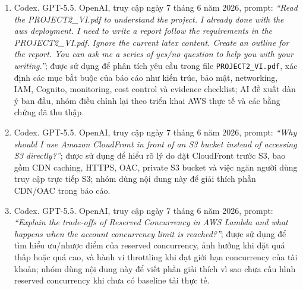 \begin{enumerate}
    \item Codex. GPT-5.5. OpenAI, truy cập ngày 7 tháng 6 năm 2026, prompt: \textit{``Read the PROJECT2\_VI.pdf to understand the project. I already done with the aws deployment. I need to write a report follow the requirements in the PROJECT2\_VI.pdf. Ignore the current latex content. Create an outline for the report. You can ask me a series of yes/no question to help you with your writing.''}; được sử dụng để phân tích yêu cầu trong file \texttt{PROJECT2\_VI.pdf}, xác định các mục bắt buộc của báo cáo như kiến trúc, bảo mật, networking, IAM, Cognito, monitoring, cost control và evidence checklist; AI đề xuất dàn ý ban đầu, nhóm điều chỉnh lại theo triển khai AWS thực tế và các bằng chứng đã thu thập.

    \item Codex. GPT-5.5. OpenAI, truy cập ngày 7 tháng 6 năm 2026, prompt: \textit{``Why should I use Amazon CloudFront in front of an S3 bucket instead of accessing S3 directly?''}; được sử dụng để hiểu rõ lý do đặt CloudFront trước S3, bao gồm CDN caching, HTTPS, OAC, private S3 bucket và việc ngăn người dùng truy cập trực tiếp S3; nhóm dùng nội dung này để giải thích phần CDN/OAC trong báo cáo.

    \item Codex. GPT-5.5. OpenAI, truy cập ngày 7 tháng 6 năm 2026, prompt: \textit{``Explain the trade-offs of Reserved Concurrency in AWS Lambda and what happens when the account concurrency limit is reached?''}; được sử dụng để tìm hiểu ưu/nhược điểm của reserved concurrency, ảnh hưởng khi đặt quá thấp hoặc quá cao, và hành vi throttling khi đạt giới hạn concurrency của tài khoản; nhóm dùng nội dung này để viết phần giải thích vì sao chưa cấu hình reserved concurrency khi chưa có baseline tải thực tế.
\end{enumerate}
